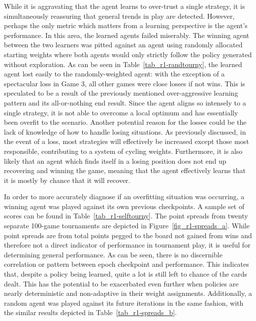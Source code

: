 While it is
aggravating that the agent learns to over-trust a single strategy,
it is simultaneously reassuring that general trends in play are detected.
%
However, perhaps the only metric which matters from a learning perspective is
the agent's performance.
%
In this area, the learned agents failed miserably.
%
The winning agent between the two learners was pitted against
an agent using randomly allocated starting weights
where both agents would only strictly follow the policy generated
without exploration.
%
As can be seen in Table~\ref{tab_r1-randtourny},
the learned agent lost easily to the randomly-weighted agent:
with the exception of a spectacular loss in Game 3,
all other games were close losses if not wins.
%
This is speculated to be a result of the previously mentioned over-aggressive
learning pattern and its all-or-nothing end result.
%
Since the agent aligns so intensely to a single strategy,
it is not able to overcome a local optimum
and has essentially been overfit to the scenario.
%
Another potential reason for the losses could be the lack of knowledge of how to
handle losing situations.
%
As previously discussed,
in the event of a loss,
most strategies will effectively be increased except those most responsible,
contributing to a system of cycling weights.
%
Furthermore, it is also likely that an agent which finds itself in a losing
position does not end up recovering and winning the game,
meaning that
the agent effectively learns that it is mostly by chance that it will recover.




In order to more accurately diagnose if an overfitting situation was occurring,
a winning agent was played against its own previous checkpoints.
%
A sample set of scores can be found in Table~\ref{tab_r1-selftourny}.
%
The point spreads from twenty separate 100-game tournaments
are depicted in Figure~\ref{fig_r1-spreads_a}.
%
While point spreads are from total points pegged to the board
not gained from wins
and therefore not a direct indicator of performance in tournament play,
it is useful for determining general performance.
%
As can be seen, there is no discernible correlation or pattern between
epoch checkpoint and performance.
%
This indicates that,
despite a policy being learned,
quite a lot is still left to chance of the cards dealt.
%
This has the potential to be exacerbated even further when policies are nearly
deterministic and non-adaptive in their weight assignments.
%
Additionally,
a random agent was played against its future iterations in the same fashion,
with the similar results depicted in Table~\ref{tab_r1-spreads_b}.


